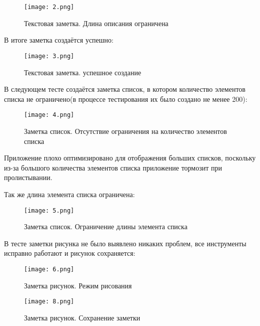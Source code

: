 \documentclass[12pt]{article}
\begin{document}
    \begin{figure}[h]
        \texttt{[image: 2.png]}
        \centering
        \caption{Текстовая заметка. Длина описания ограничена}
    \end{figure}

    \newpage

    В итоге заметка создаётся успешно:

    \begin{figure}[h]
        \texttt{[image: 3.png]}
        \centering
        \caption{Текстовая заметка. успешное создание}
    \end{figure}

    \newpage

    В следующем тесте создаётся заметка список, в котором количество элементов списка не ограничено(в процессе тестирования их было создано не менее 200):

    \begin{figure}[h]
        \texttt{[image: 4.png]}
        \centering
        \caption{Заметка список. Отсутствие ограничения на количество элементов списка}
    \end{figure}

    Приложение плохо оптимизировано для отображения больших списков, поскольку из-за большого количества элементов списка приложение тормозит при пролистывании.

    \newpage

    Так же длина элемента списка ограничена:

    \begin{figure}[h]
        \texttt{[image: 5.png]}
        \centering
        \caption{Заметка список. Ограничение длины элемента списка}
    \end{figure}

    \newpage

    В тесте заметки рисунка не было выявлено никаких проблем, все инструменты исправно работают и рисунок сохраняется:

    \begin{figure}[h]
        \texttt{[image: 6.png]}
        \centering
        \caption{Заметка рисунок. Режим рисования}
    \end{figure}

    \newpage

    \begin{figure}[h]
        \texttt{[image: 8.png]}
        \centering
        \caption{Заметка рисунок. Сохранение заметки}
    \end{figure}
\end{document}
